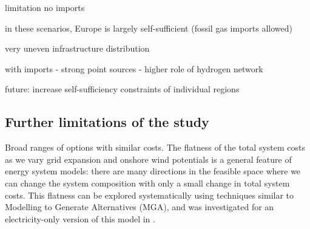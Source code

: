 limitation no imports

in these scenarios, Europe is largely self-sufficient (fossil gas imports allowed)

very uneven infrastructure distribution

with imports
- strong point sources
- higher role of hydrogen network

future: increase self-sufficiency constraints of individual regions

\subsection*{Further limitations of the study}

Broad ranges of options with similar costs. The flatness of the total system
costs as we vary grid expansion and onshore wind potentials is a general feature
of energy system models: there are many directions in the feasible space where
we can change the system composition with only a small change in total system
costs. This flatness can be explored systematically using techniques similar to
Modelling to Generate Alternatives (MGA), and was investigated for an
electricity-only version of this model in \cite{Neumann2019}.
